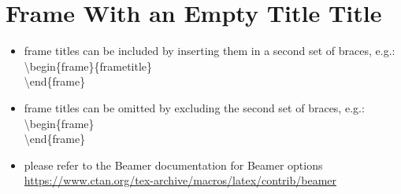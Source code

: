 \documentclass[aspectratio=43,display]{beamer}
\begin{document}
\section[No Title Frame]{Frame With an Empty Title Title}
\begin{frame}[<1->]
	
	\begin{itemize}
	
		\item frame titles can be included by inserting them in a second set of braces, e.g.: \\
		\textbackslash begin\{frame\}\{frametitle\} \\
		\textbackslash end\{frame\}
		
		\item frame titles can be omitted by excluding the second set of braces, e.g.: \\
		\textbackslash begin\{frame\} \\
		\textbackslash end\{frame\}
		
		\item please refer to the Beamer documentation for Beamer options \\
		\footnotesize
		\url{https://www.ctan.org/tex-archive/macros/latex/contrib/beamer}
	\end{itemize}
	
\end{frame}
\end{document}
